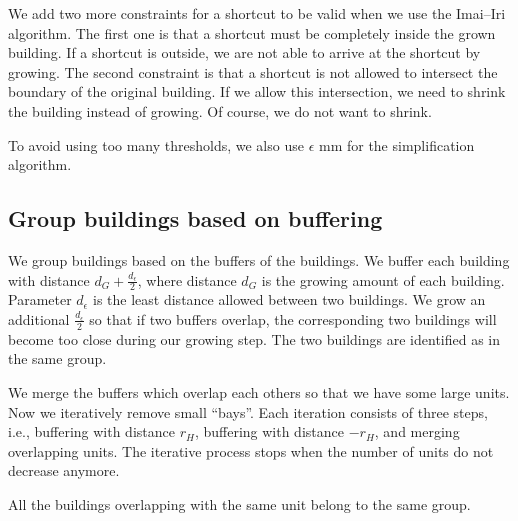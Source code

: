 \documentclass[graybox]{svmult}
\begin{document}
We add two more constraints for a shortcut to be valid
when we use the Imai--Iri algorithm. 
The first one is that
a shortcut must be completely inside the grown building.
If a shortcut is outside,
we are not able to arrive at the shortcut by growing.
The second constraint is that a shortcut is not allowed to intersect the 
boundary of the original building.
If we allow this intersection, 
we need to shrink the building instead of growing. 
Of course, we do not want to shrink.

To avoid using too many thresholds, we also use $\epsilon$ mm for the 
simplification algorithm.



\subsection{Group buildings based on buffering}
\label{sec:Grouping}
We group buildings based on the buffers of the buildings. 
We buffer each building with distance $d_G + \frac{d_\epsilon}{2}$, 
where distance $d_G$ is the growing amount of each building. 
Parameter $d_\epsilon$ is the least distance allowed between two buildings.
We grow an additional $\frac{d_\epsilon}{2}$ so that if two buffers overlap, 
the corresponding two buildings will become too close during our growing step.
The two buildings are identified as in the same group.

We merge the buffers which overlap each others so that we have some large units.
Now we iteratively remove small ``bays''.
Each iteration consists of three steps, i.e., 
buffering with distance $r_H$, buffering with distance $-r_H$, and
merging overlapping units.
The iterative process stops when the number of units do not decrease anymore.

All the buildings overlapping with the same unit belong to the same group.






%
\end{document}
